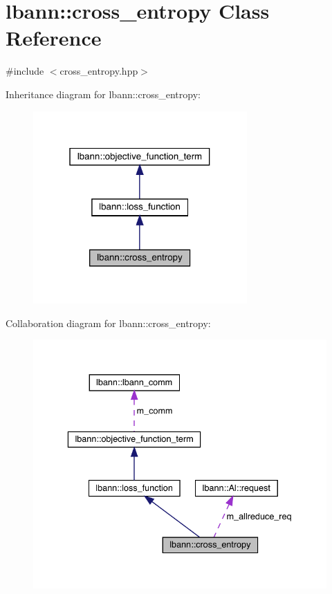 \hypertarget{classlbann_1_1cross__entropy}{}\section{lbann\+:\+:cross\+\_\+entropy Class Reference}
\label{classlbann_1_1cross__entropy}


{\ttfamily \#include $<$cross\+\_\+entropy.\+hpp$>$}



Inheritance diagram for lbann\+:\+:cross\+\_\+entropy\+:\nopagebreak
\begin{figure}[H]
\begin{center}
\leavevmode
\includegraphics[width=232pt]{classlbann_1_1cross__entropy__inherit__graph}
\end{center}
\end{figure}


Collaboration diagram for lbann\+:\+:cross\+\_\+entropy\+:\nopagebreak
\begin{figure}[H]
\begin{center}
\leavevmode
\includegraphics[width=336pt]{classlbann_1_1cross__entropy__coll__graph}
\end{center}
\end{figure}
